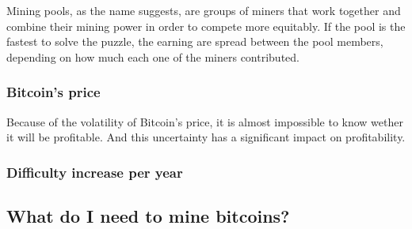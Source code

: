 \documentclass{article}
\begin{document}
 Mining pools, as the name suggests, are groups of miners that work together and combine their mining power in order to compete more equitably. If the pool is the fastest to solve the puzzle, the earning are spread between the pool members, depending on how much each one of the miners contributed.
 
 
 \subsubsection{Bitcoin's price}
 
 Because of the volatility of Bitcoin's price, it is almost impossible to know wether it will be profitable. And this uncertainty has a significant impact on profitability.
 
 \subsubsection{Difficulty increase per year}
 
 \subsection{What do I need to mine bitcoins?}
 
 
 
 
 
 





\nocite{*}
\printbibliography
\end{document}
